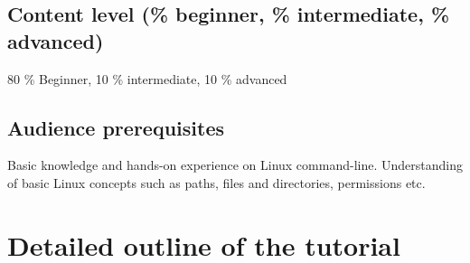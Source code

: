 \documentclass{report}
\begin{document}
\subsection*{Content level (\% beginner, \% intermediate, \% advanced)}
80 \% Beginner, 10 \% intermediate, 10 \% advanced
\subsection*{Audience prerequisites}
Basic knowledge and hands-on experience on Linux command-line. Understanding of
basic Linux concepts such as paths, files and directories, permissions etc.

\section*{Detailed outline of the tutorial}
\end{document}
